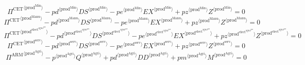 \begin{equation}
{\Pi^{\mathrm{CET}}}^{\langle \mathrm{prod}^{\mathrm{Min}}\rangle} - {{{p\!d}}^{\langle \mathrm{prod}^{\mathrm{Min}}\rangle}} {{{D\!S}}^{\langle \mathrm{prod}^{\mathrm{Min}}\rangle}} - {{{p\!e}}^{\langle \mathrm{prod}^{\mathrm{Min}}\rangle}} {{{E\!X}}^{\langle \mathrm{prod}^{\mathrm{Min}}\rangle}} + {{{p\!z}}^{\langle \mathrm{prod}^{\mathrm{Min}}\rangle}} {{Z}^{\langle \mathrm{prod}^{\mathrm{Min}}\rangle}} = 0
\end{equation}
\begin{equation}
{\Pi^{\mathrm{CET}}}^{\langle \mathrm{prod}^{\mathrm{Manu}}\rangle} - {{{p\!d}}^{\langle \mathrm{prod}^{\mathrm{Manu}}\rangle}} {{{D\!S}}^{\langle \mathrm{prod}^{\mathrm{Manu}}\rangle}} - {{{p\!e}}^{\langle \mathrm{prod}^{\mathrm{Manu}}\rangle}} {{{E\!X}}^{\langle \mathrm{prod}^{\mathrm{Manu}}\rangle}} + {{{p\!z}}^{\langle \mathrm{prod}^{\mathrm{Manu}}\rangle}} {{Z}^{\langle \mathrm{prod}^{\mathrm{Manu}}\rangle}} = 0
\end{equation}
\begin{equation}
{\Pi^{\mathrm{CET}}}^{\langle \mathrm{prod}^{\mathrm{elect}^{\mathrm{agua}^{\mathrm{gas}}}}\rangle} - {{{p\!d}}^{\langle \mathrm{prod}^{\mathrm{elect}^{\mathrm{agua}^{\mathrm{gas}}}}\rangle}} {{{D\!S}}^{\langle \mathrm{prod}^{\mathrm{elect}^{\mathrm{agua}^{\mathrm{gas}}}}\rangle}} - {{{p\!e}}^{\langle \mathrm{prod}^{\mathrm{elect}^{\mathrm{agua}^{\mathrm{gas}}}}\rangle}} {{{E\!X}}^{\langle \mathrm{prod}^{\mathrm{elect}^{\mathrm{agua}^{\mathrm{gas}}}}\rangle}} + {{{p\!z}}^{\langle \mathrm{prod}^{\mathrm{elect}^{\mathrm{agua}^{\mathrm{gas}}}}\rangle}} {{Z}^{\langle \mathrm{prod}^{\mathrm{elect}^{\mathrm{agua}^{\mathrm{gas}}}}\rangle}} = 0
\end{equation}
\begin{equation}
{\Pi^{\mathrm{CET}}}^{\langle \mathrm{prod}^{\mathrm{serv}}\rangle} - {{{p\!d}}^{\langle \mathrm{prod}^{\mathrm{serv}}\rangle}} {{{D\!S}}^{\langle \mathrm{prod}^{\mathrm{serv}}\rangle}} - {{{p\!e}}^{\langle \mathrm{prod}^{\mathrm{serv}}\rangle}} {{{E\!X}}^{\langle \mathrm{prod}^{\mathrm{serv}}\rangle}} + {{{p\!z}}^{\langle \mathrm{prod}^{\mathrm{serv}}\rangle}} {{Z}^{\langle \mathrm{prod}^{\mathrm{serv}}\rangle}} = 0
\end{equation}
\begin{equation}
{\Pi^{\mathrm{ARM}}}^{\langle \mathrm{prod}^{\mathrm{Agri}}\rangle} - {{p}^{\langle \mathrm{prod}^{\mathrm{Agri}}\rangle}} {{Q}^{\langle \mathrm{prod}^{\mathrm{Agri}}\rangle}} + {{{p\!d}}^{\langle \mathrm{prod}^{\mathrm{Agri}}\rangle}} {{{D\!D}}^{\langle \mathrm{prod}^{\mathrm{Agri}}\rangle}} + {{{p\!m}}^{\langle \mathrm{prod}^{\mathrm{Agri}}\rangle}} {{M}^{\langle \mathrm{prod}^{\mathrm{Agri}}\rangle}} = 0
\end{equation}
